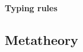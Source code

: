 \documentclass[main.tex]{subfiles}
\begin{document}

\paragraph{Typing rules}%
\label{sec:lvar-typing}
% 
% 

\subsection{Metatheory}


\end{document}
